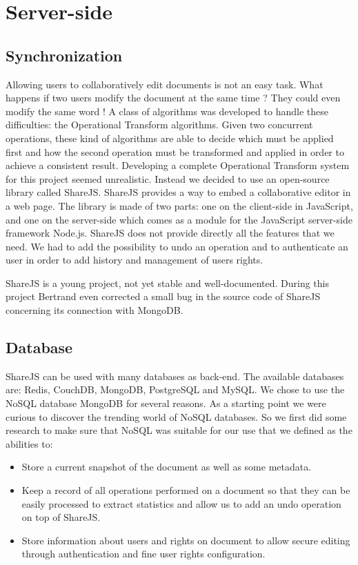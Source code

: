 \documentclass{llncs}
\begin{document}
\section{Server-side}\label{sec:Server-side}

\subsection{Synchronization}

Allowing users to collaboratively edit documents is not an easy task.
What happens if two users modify the document at the same time ?
They could even modify the same word ! A class of algorithms was developed to handle these difficulties:
the Operational Transform algorithms. Given two concurrent operations, these kind
of algorithms are able to decide which must be applied first and how the second
operation must be transformed and applied in order to achieve a consistent result.
Developing a complete Operational Transform system for this project seemed unrealistic.
Instead we decided to use an open-source library called ShareJS.\cite{sharejs}
ShareJS provides a way to embed a collaborative editor in a web page.
The library is made of two parts: one on the client-side in JavaScript, 
and one on the server-side which comes as a module for the JavaScript server-side framework
Node.js.
ShareJS does not provide directly all the features that we need. 
We had to add the possibility to undo an operation and to authenticate an user in order to add
history and management of users rights.

ShareJS is a young project, not yet stable and well-documented.
During this project Bertrand even corrected a small bug in the source code of ShareJS concerning its connection with MongoDB.

\subsection{Database}
ShareJS can be used with many databases as back-end. 
The available databases are: Redis, CouchDB, MongoDB, PostgreSQL and MySQL.
We chose to use the NoSQL database MongoDB\cite{mongo} for several reasons. As a starting
point we were curious to discover the trending world of NoSQL databases. So we
first did some research to make sure that NoSQL was suitable for our use that we
defined as the abilities to:

\begin{itemize}
        \item Store a current snapshot of the document as well as some metadata.
        \item Keep a record of all operations performed on a document so that
            they can be easily processed to extract statistics and allow us to
            add an undo operation on top of ShareJS.
        \item Store information about users and rights on document to allow
            secure editing through authentication and fine user rights
            configuration.
\end{itemize}
\end{document}
